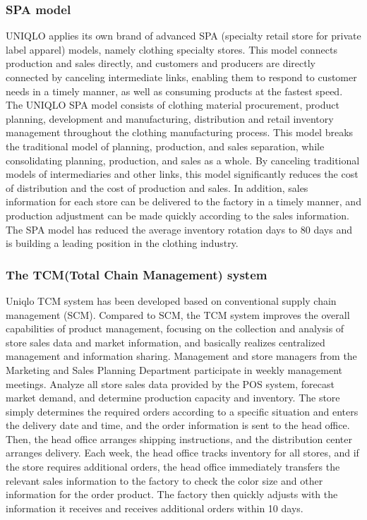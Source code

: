 \documentclass[12pt,]{article}
\begin{document}
\hypertarget{spa-model}{%
\subsubsection{SPA model}\label{spa-model}}

UNIQLO applies its own brand of advanced SPA (specialty retail store for
private label apparel) models, namely clothing specialty stores. This
model connects production and sales directly, and customers and
producers are directly connected by canceling intermediate links,
enabling them to respond to customer needs in a timely manner, as well
as consuming products at the fastest speed. The UNIQLO SPA model
consists of clothing material procurement, product planning, development
and manufacturing, distribution and retail inventory management
throughout the clothing manufacturing process. This model breaks the
traditional model of planning, production, and sales separation, while
consolidating planning, production, and sales as a whole. By canceling
traditional models of intermediaries and other links, this model
significantly reduces the cost of distribution and the cost of
production and sales. In addition, sales information for each store can
be delivered to the factory in a timely manner, and production
adjustment can be made quickly according to the sales information. The
SPA model has reduced the average inventory rotation days to 80 days and
is building a leading position in the clothing industry.

\hypertarget{the-tcmtotal-chain-management-system}{%
\subsubsection{The TCM(Total Chain Management)
system}\label{the-tcmtotal-chain-management-system}}

Uniqlo TCM system has been developed based on conventional supply chain
management (SCM). Compared to SCM, the TCM system improves the overall
capabilities of product management, focusing on the collection and
analysis of store sales data and market information, and basically
realizes centralized management and information sharing. Management and
store managers from the Marketing and Sales Planning Department
participate in weekly management meetings. Analyze all store sales data
provided by the POS system, forecast market demand, and determine
production capacity and inventory. The store simply determines the
required orders according to a specific situation and enters the
delivery date and time, and the order information is sent to the head
office. Then, the head office arranges shipping instructions, and the
distribution center arranges delivery. Each week, the head office tracks
inventory for all stores, and if the store requires additional orders,
the head office immediately transfers the relevant sales information to
the factory to check the color size and other information for the order
product. The factory then quickly adjusts with the information it
receives and receives additional orders within 10 days.
\end{document}
